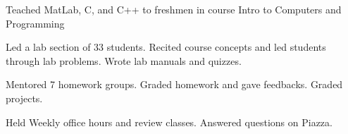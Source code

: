 \SJTU
{}

Teached MatLab, C, and C++ to freshmen in course Intro to Computers and Programming

\begin{miniItemize}
    \item Led a lab section of 33 students. Recited course concepts and led students through lab problems. Wrote lab manuals and quizzes.
    \item Mentored 7 homework groups. Graded homework and gave feedbacks. Graded projects.
    \item Held Weekly office hours and review classes. Answered questions on Piazza.
\end{miniItemize}
